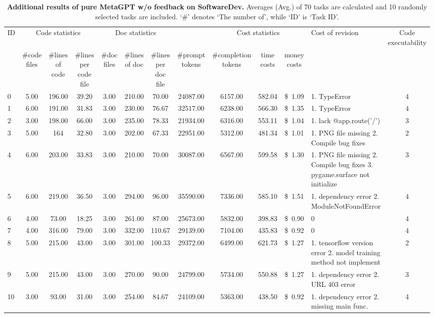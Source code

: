 \begin{table}
\centering
\caption{\textbf{Additional results of pure MetaGPT w/o feedback on SoftwareDev.} Averages (Avg.) of 70 tasks are calculated and 10 randomly selected tasks are included. `\#' denotes `The number of', while `ID' is `Task ID'.}
\label{tab:result_details}
\renewcommand\tabcolsep{0.8pt}
\renewcommand\arraystretch{1.2}
\small
\begin{tabular}{lccccccccccp{2.5cm}c}
\hline

\hline

\hline

\hline
ID & \multicolumn{3}{c}{Code statistics} & \multicolumn{3}{c}{Doc statistics} & & \multicolumn{3}{c}{Cost statistics} & Cost of revision & Code executability
\\
\cline{2-3} \cline{4-7} \cline{8-11} 
& \#code files & \#lines of code & \#lines per code file & \#doc files & \#lines of doc & \#lines per doc file & \#prompt tokens & \#completion tokens & time costs & money costs & &  \\ %
\hline

\hline
0 & 5.00 & 196.00 & 39.20 & 3.00 & 210.00 & 70.00 & 24087.00 & 6157.00 & 582.04 & \$~1.09 & 1. TypeError & 4 \\ %
1 & 6.00 & 191.00 & 31.83 & 3.00 & 230.00 & 76.67 & 32517.00 & 6238.00 & 566.30 & \$~1.35 & 1. TypeError & 4 \\ %
2 & 3.00 & 198.00 & 66.00 & 3.00 & 235.00 & 78.33 & 21934.00 & 6316.00 & 553.11 & \$~1.04 & 1. lack @app.route('/') & 3 \\ %
3 & 5.00 & 164 & 32.80 & 3.00 & 202.00 & 67.33 & 22951.00 & 5312.00 & 481.34 & \$~1.01 & 1. PNG file missing 2. Compile bug fixes & 2 \\ %
4 & 6.00 & 203.00 & 33.83 & 3.00 & 210.00 & 70.00 & 30087.00 & 6567.00 & 599.58 & \$~1.30 & 1. PNG file missing 2. Compile bug fixes 3. pygame.surface not initialize & 3 \\ %
5 & 6.00 & 219.00 & 36.50 & 3.00 & 294.00 & 96.00 & 35590.00 & 7336.00 & 585.10 & \$~1.51 & 1. dependency error 2. ModuleNotFoundError & 4 \\ %
6 & 4.00 & 73.00 & 18.25 & 3.00 & 261.00 & 87.00 & 25673.00 & 5832.00 & 398.83 & \$~0.90 & 0 & 4 \\ %
\hline

\hline
7 & 4.00 & 316.00 & 79.00 & 3.00 & 332.00 & 110.67 & 29139.00 & 7104.00 & 435.83 & \$~0.92 & 0 & 4 \\ %
8 & 5.00 & 215.00 & 43.00 & 3.00 & 301.00 & 100.33 & 29372.00 & 6499.00 & 621.73 & \$~1.27 & 1. tensorflow version error 2. model training method not implement & 2 \\ %
9 & 5.00 & 215.00 & 43.00 & 3.00 & 270.00 & 90.00 & 24799.00 & 5734.00 & 550.88 & \$~1.27 & 1. dependency error 2. URL 403 error & 3 \\ %
10 & 3.00 & 93.00 & 31.00 & 3.00 & 254.00 & 84.67 & 24109.00 & 5363.00 & 438.50 & \$~0.92 & 1. dependency error 2. missing main func. & 4 \\ %
\hline


\end{tabular}
\end{table}
